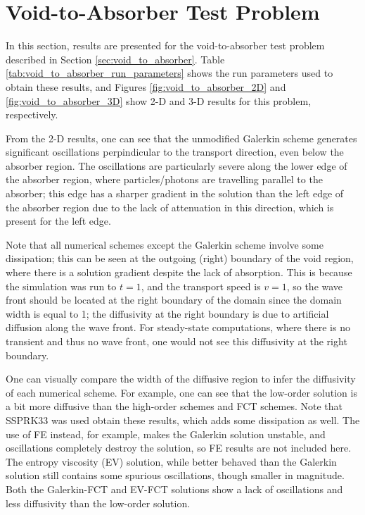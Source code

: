 \section{Void-to-Absorber Test Problem}

In this section, results are presented for the void-to-absorber test problem
described in Section \ref{sec:void_to_absorber}.
Table \ref{tab:void_to_absorber_run_parameters} shows the run parameters used
to obtain these results, and Figures \ref{fig:void_to_absorber_2D}
and \ref{fig:void_to_absorber_3D} show 2-D and 3-D results for this
problem, respectively.

From the 2-D results, one can see that the unmodified Galerkin scheme
generates significant oscillations perpindicular to the transport
direction, even below the absorber region. The oscillations are
particularly severe along the lower edge of the absorber region,
where particles/photons are travelling parallel to the absorber;
this edge has a sharper gradient in the solution than the left
edge of the absorber region due to the lack of attenuation in
this direction, which is present for the left edge.

Note that all numerical schemes except the Galerkin scheme involve some
dissipation; this can be seen at the outgoing (right) boundary of the void
region, where there is a solution gradient despite the lack of
absorption. This is because the simulation was run to $t=1$, and the transport
speed is $v=1$, so the wave front should be located at the right
boundary of the domain since the domain width is equal to 1;
the diffusivity at the right boundary is due to artificial diffusion
along the wave front.
For steady-state computations, where there is no transient and
thus no wave front, one would not see this diffusivity
at the right boundary.

One can visually compare the width
of the diffusive region to infer the diffusivity of each
numerical scheme. For example, one can see that the low-order
solution is a bit more diffusive than the high-order schemes
and FCT schemes.
Note that SSPRK33 was used obtain these results, which
adds some dissipation as well. The use of FE instead, for example,
makes the Galerkin solution unstable, and oscillations completely
destroy the solution, so FE results are not included here.
The entropy viscosity (EV) solution, while better behaved than the
Galerkin solution still contains some spurious oscillations,
though smaller in magnitude. Both the Galerkin-FCT and EV-FCT
solutions show a lack of oscillations and less diffusivity than the low-order
solution.

